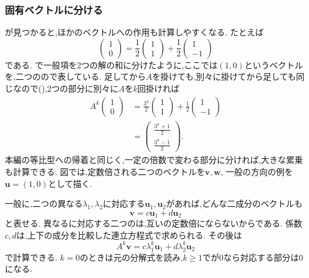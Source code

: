 \subsubsection{固有ベクトルに分ける}

が見つかると,ほかのベクトルへの作用も計算しやすくなる.
たとえば
\[
  \begin{pmatrix}1\\0\end{pmatrix}
  =\frac12\begin{pmatrix}1\\1\end{pmatrix}
  +\frac12\begin{pmatrix}1\\-1\end{pmatrix}
\]
である.
で一般項を2つの解の和に分けたように,ここでは$(1,0)$というベクトルを,二つのので表している.
足してから$A$を掛けても,別々に掛けてから足しても同じなので(),2つの部分に別々に$A$を$k$回掛ければ
\[
  \begin{aligned}
    A^k\begin{pmatrix}1\\0\end{pmatrix}
    &=\frac{3^k}{2}\begin{pmatrix}1\\1\end{pmatrix}
    +\frac12\begin{pmatrix}1\\-1\end{pmatrix}\\
    &=\begin{pmatrix}\frac{3^k+1}{2}\\\frac{3^k-1}{2}\end{pmatrix}.
  \end{aligned}
\]
本編の等比型への帰着と同じく,一定の倍数で変わる部分に分ければ,大きな累乗も計算できる.
図では,定数倍される二つのベクトルを$\boldsymbol v,\boldsymbol w$,
一般の方向の例を$\boldsymbol u=(1,0)$として描く.
\BookFigEigen

一般に,二つの異なる$\lambda_1,\lambda_2$に対応する$\boldsymbol{u}_1,\boldsymbol{u}_2$があれば,どんな二成分のベクトルも
\[
  \boldsymbol{v}=c\boldsymbol{u}_1+d\boldsymbol{u}_2
\]
と表せる.
異なるに対応する二つのは,互いの定数倍にならないからである.
係数$c,d$は,上下の成分を比較した連立方程式で求められる.
その後は
\[
  A^k\boldsymbol{v}
  =c\lambda_1^k\boldsymbol{u}_1+d\lambda_2^k\boldsymbol{u}_2
\]
で計算できる.
$k=0$のときは元の分解式を読み,$k\ge1$でが$0$なら対応する部分は0になる.

